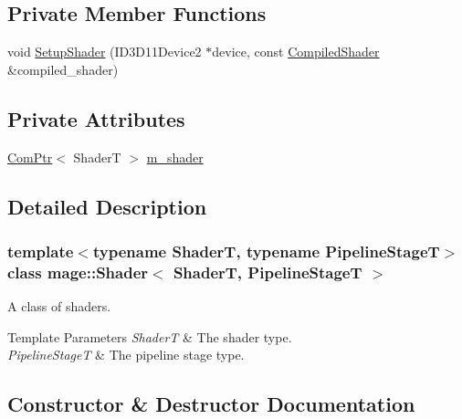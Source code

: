 \subsection*{Private Member Functions}
\begin{DoxyCompactItemize}
\item 
void \hyperlink{classmage_1_1_shader_ab98f1387553fbe7b62ec2722be5a421a}{Setup\+Shader} (I\+D3\+D11\+Device2 $\ast$device, const \hyperlink{structmage_1_1_compiled_shader}{Compiled\+Shader} \&compiled\+\_\+shader)
\end{DoxyCompactItemize}
\subsection*{Private Attributes}
\begin{DoxyCompactItemize}
\item 
\hyperlink{namespacemage_ae74f374780900893caa5555d1031fd79}{Com\+Ptr}$<$ ShaderT $>$ \hyperlink{classmage_1_1_shader_ac63260bdb25648451ddc1ee09d67c061}{m\+\_\+shader}
\end{DoxyCompactItemize}


\subsection{Detailed Description}
\subsubsection*{template$<$typename ShaderT, typename Pipeline\+StageT$>$\newline
class mage\+::\+Shader$<$ Shader\+T, Pipeline\+Stage\+T $>$}

A class of shaders.


\begin{DoxyTemplParams}{Template Parameters}
{\em ShaderT} & The shader type. \\
\hline
{\em Pipeline\+StageT} & The pipeline stage type. \\
\hline
\end{DoxyTemplParams}


\subsection{Constructor \& Destructor Documentation}
\hypertarget{classmage_1_1_shader_ab5b6db34961dd3d65bfe4ec1452966e6}{}\label{classmage_1_1_shader_ab5b6db34961dd3d65bfe4ec1452966e6} 
